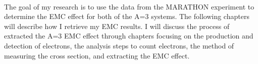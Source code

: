 \paragraph{}The goal of my research is to use the data from the MARATHON experiment to determine the EMC effect for both of the A=3 systems. The following chapters will describe how I retrieve my EMC results. I will discuss the process of extracted the A=3 EMC effect through chapters focusing on the production and detection of electrons, the analysis steps to count electrons, the method of measuring the cross section, and extracting the EMC effect.  



